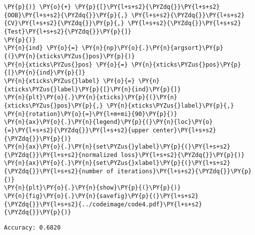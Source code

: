 \begin{Verbatim}[commandchars=\\\{\}]
    \PY{p}{)} \PY{o}{+} \PY{p}{[}\PY{l+s+s2}{\PYZdq{}}\PY{l+s+s2}{OOB}\PY{l+s+s2}{\PYZdq{}}\PY{p}{,} \PY{l+s+s2}{\PYZdq{}}\PY{l+s+s2}{CV}\PY{l+s+s2}{\PYZdq{}}\PY{p}{,} \PY{l+s+s2}{\PYZdq{}}\PY{l+s+s2}{Test}\PY{l+s+s2}{\PYZdq{}}\PY{p}{]}
\PY{p}{)}
\PY{n}{ind} \PY{o}{=} \PY{n}{np}\PY{o}{.}\PY{n}{argsort}\PY{p}{(}\PY{n}{xticks\PYZus{}pos}\PY{p}{)}
\PY{n}{xticks\PYZus{}pos} \PY{o}{=} \PY{n}{xticks\PYZus{}pos}\PY{p}{[}\PY{n}{ind}\PY{p}{]}
\PY{n}{xticks\PYZus{}label} \PY{o}{=} \PY{n}{xticks\PYZus{}label}\PY{p}{[}\PY{n}{ind}\PY{p}{]}
\PY{n}{plt}\PY{o}{.}\PY{n}{xticks}\PY{p}{(}\PY{n}{xticks\PYZus{}pos}\PY{p}{,} \PY{n}{xticks\PYZus{}label}\PY{p}{,} \PY{n}{rotation}\PY{o}{=}\PY{l+m+mi}{90}\PY{p}{)}
\PY{n}{ax}\PY{o}{.}\PY{n}{legend}\PY{p}{(}\PY{n}{loc}\PY{o}{=}\PY{l+s+s2}{\PYZdq{}}\PY{l+s+s2}{upper center}\PY{l+s+s2}{\PYZdq{}}\PY{p}{)}
\PY{n}{ax}\PY{o}{.}\PY{n}{set\PYZus{}ylabel}\PY{p}{(}\PY{l+s+s2}{\PYZdq{}}\PY{l+s+s2}{normalized loss}\PY{l+s+s2}{\PYZdq{}}\PY{p}{)}
\PY{n}{ax}\PY{o}{.}\PY{n}{set\PYZus{}xlabel}\PY{p}{(}\PY{l+s+s2}{\PYZdq{}}\PY{l+s+s2}{number of iterations}\PY{l+s+s2}{\PYZdq{}}\PY{p}{)}
\PY{n}{plt}\PY{o}{.}\PY{n}{show}\PY{p}{(}\PY{p}{)}
\PY{n}{fig}\PY{o}{.}\PY{n}{savefig}\PY{p}{(}\PY{l+s+s2}{\PYZdq{}}\PY{l+s+s2}{../codeimage/code4.pdf}\PY{l+s+s2}{\PYZdq{}}\PY{p}{)}
\end{Verbatim}

\begin{Verbatim}[commandchars=\\\{\}]
Accuracy: 0.6820
\end{Verbatim}